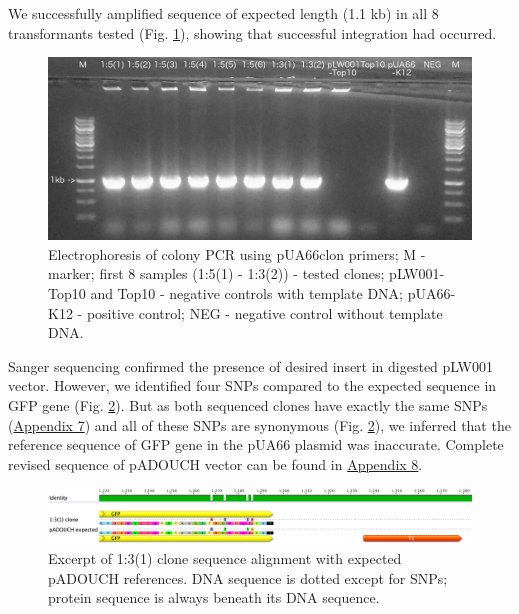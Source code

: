 We successfully amplified sequence of expected length (1.1 kb) in all 8 transformants tested (Fig. \ref{colonyPCR}), showing that successful integration had occurred.
\begin{figure}[h!]
  \centering
  \includegraphics[scale=0.2]{text/Pictures/ColonyPCR.jpg}
	\caption{Electrophoresis of colony PCR using pUA66\textunderscore clon primers; M - marker; first 8 samples (1:5(1) - 1:3(2)) - tested clones; pLW001-Top10 and Top10 - negative controls with template DNA; pUA66-K12 - positive control; NEG - negative control without template DNA.}
	\label{colonyPCR}
\end{figure}
Sanger sequencing confirmed the presence of desired insert in digested pLW001 vector.
However, we identified four SNPs compared to the expected sequence in GFP gene (Fig. \ref{1:3(1)seq}).
But as both sequenced clones have exactly the same SNPs (\hyperlink{pADOUCHseq}{Appendix 7}) and all of these SNPs are synonymous (Fig. \ref{1:3(1)seq}), we inferred that the reference sequence of GFP gene in the pUA66 plasmid was inaccurate.
Complete revised sequence of pADOUCH vector can be found in \hyperlink{pADOUCHwhole}{Appendix 8}.
\begin{figure}[ht]
  \centering
  \includegraphics[scale=0.26]{text/Pictures/pADOUCHseq.png}
	\caption{Excerpt of 1:3(1) clone sequence alignment with expected pADOUCH references. DNA sequence is dotted except for SNPs; protein sequence is always beneath its DNA sequence.}
	\label{1:3(1)seq}
\end{figure}

\shorthandon{-} 


